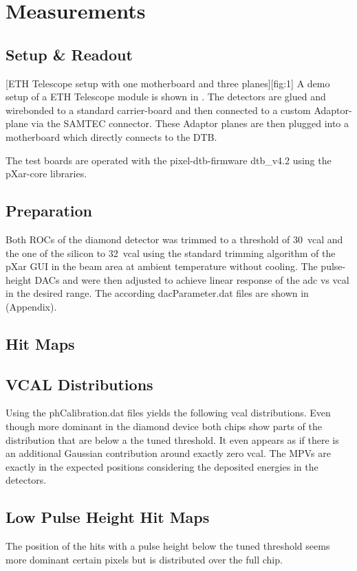 \section{Measurements}

\subsection{Setup \& Readout}
[ETH Telescope setup with one motherboard and three planes][fig:1]
A demo setup of a ETH Telescope module is shown in . The detectors are glued and wirebonded to a standard carrier-board and then connected to a custom Adaptor-plane via the SAMTEC connector. These Adaptor planes are then plugged into a motherboard which directly connects to the \ac{DTB}.\par
The test boards are operated with the pixel-dtb-firmware dtb\_v4.2 using the pXar-core libraries.

\subsection{Preparation}
Both \acp{ROC} of the diamond detector was trimmed to a threshold of \SI{30}{vcal} and the one of the silicon to \SI{32}{vcal} using the standard trimming algorithm of the pXar GUI in the beam area at ambient temperature without cooling. The pulse-height \acp{DAC}  and  were then adjusted to achieve linear response of the adc vs vcal in the desired range. The according dacParameter.dat files are shown in  (Appendix).

\subsection{Hit Maps}

\subsection{VCAL Distributions}
Using the phCalibration.dat files yields the following vcal distributions.
Even though more dominant in the diamond device both chips show parts of the distribution that are below a the tuned threshold. It even appears as if there is an additional Gaussian contribution around exactly zero vcal. The \acp{MPV} are exactly in the expected positions considering the deposited energies in the detectors.

\subsection{Low Pulse Height Hit Maps}
The position of the hits with a pulse height below the tuned threshold seems more dominant certain pixels but is distributed over the full chip.
